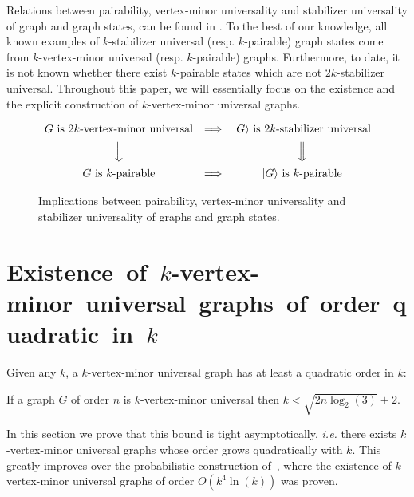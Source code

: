 \documentclass[a4paper,UKenglish,cleveref, autoref, thm-restate]{arxiv}
\newcommand{\ket}[1]{{\ensuremath{\lvert#1\rangle}}}
\begin{document}
Relations between pairability, vertex-minor universality and stabilizer universality of graph and graph states, can be found in . To the best of our knowledge, all known examples of $k$-stabilizer universal (resp. $k$-pairable) graph states come from $k$-vertex-minor universal (resp. $k$-pairable) graphs. Furthermore, to  date, it is not known whether there exist $k$-pairable states which are not $2k$-stabilizer universal. Throughout this paper, we will essentially focus on the existence and the explicit construction of $k$-vertex-minor universal graphs.

\begin{figure}[ht]
\centering
$$
\begin{array}
[c]{ccc}
\vspace{0.5em} G \text{ is $2k$-vertex-minor universal} & \Longrightarrow & \ket G \text{ is $2k$-stabilizer universal} \\
\vspace{0.5em} \Big\Downarrow &  & \Big\Downarrow \\
G \text{ is $k$-pairable} & \Longrightarrow & \ket G \text{ is $k$-pairable} 
\end{array}
$$
\caption{Implications between pairability, vertex-minor universality and stabilizer universality of graphs and graph states.}
\label{fig:implications}
\end{figure}

\section{Existence~of~$k$-vertex-minor~universal~graphs~of~order~quadratic~in~$k$}
\label{sec:existence-mvu-quadratic-order}

Given any $k$, a $k$-vertex-minor universal graph has at least a quadratic order in $k$:%

\begin{proposition}
    \!If a graph $G$ of order $n$ is $k$-vertex-minor universal then $k\!\!<\!\! \sqrt{2n\log_2(3)}\!+\!2$.
\end{proposition}

In this section we prove that this bound is tight asymptotically, \emph{i.e.} there exists $k$-vertex-minor universal graphs whose order grows quadratically with $k$. This greatly improves over the probabilistic construction of~\cite{claudet2023small}, where the existence of $k$-vertex-minor universal graphs of order $O(k^4\ln(k))$ was proven.
\end{document}
